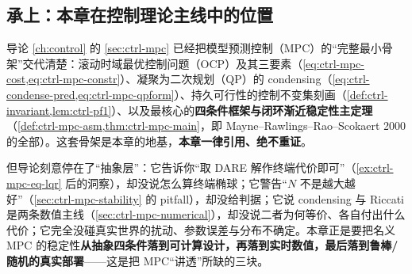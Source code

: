 \subsection*{承上：本章在控制理论主线中的位置}
导论 \cref{ch:control} 的 \cref{sec:ctrl-mpc} 已经把模型预测控制（MPC）的“完整最小骨架”交代清楚：滚动时域最优控制问题（OCP）及其三要素（\cref{eq:ctrl-mpc-cost,eq:ctrl-mpc-constr}）、凝聚为二次规划（QP）的 condensing（\cref{eq:ctrl-condense-pred,eq:ctrl-mpc-qpform}）、持久可行性的控制不变集刻画（\cref{def:ctrl-invariant,lem:ctrl-pf1}）、以及最核心的\textbf{四条件框架与闭环渐近稳定性主定理}（\cref{def:ctrl-mpc-asm,thm:ctrl-mpc-main}，即 Mayne--Rawlings--Rao--Scokaert 2000 的全部）。这套骨架是本章的地基，\textbf{本章一律引用、绝不重证}。

但导论刻意停在了“抽象层”：它告诉你“取 DARE 解作终端代价即可”（\cref{ex:ctrl-mpc-eq-lqr} 后的洞察），却没说怎么算终端椭球；它警告“$N$ 不是越大越好”（\cref{sec:ctrl-mpc-stability} 的 pitfall），却没给判据；它说 condensing 与 Riccati 是两条数值主线（\cref{sec:ctrl-mpc-numerical}），却没说二者为何等价、各自付出什么代价；它完全没碰真实世界的扰动、参数误差与分布不确定。本章正是要把名义 MPC 的稳定性\textbf{从抽象四条件落到可计算设计，再落到实时数值，最后落到鲁棒/随机的真实部署}——这是把 MPC“讲透”所缺的三块。

